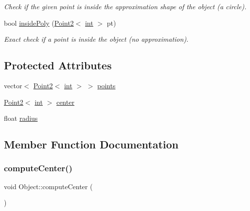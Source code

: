 \begin{DoxyCompactItemize}
\begin{DoxyCompactList}\small\item\em Check if the given point is inside the approximation shape of the object (a circle). \end{DoxyCompactList}\item 
bool \mbox{\hyperlink{class_object_a8f54d70eb539d4ea2d05993cfd51fcc9}{inside\+Poly}} (\mbox{\hyperlink{class_point2}{Point2}}$<$ \mbox{\hyperlink{draw_8hh_aa620a13339ac3a1177c86edc549fda9b}{int}} $>$ pt)
\begin{DoxyCompactList}\small\item\em Exact check if a point is inside the object (no approximation). \end{DoxyCompactList}\end{DoxyCompactItemize}
\subsection*{Protected Attributes}
\begin{DoxyCompactItemize}
\item 
vector$<$ \mbox{\hyperlink{class_point2}{Point2}}$<$ \mbox{\hyperlink{draw_8hh_aa620a13339ac3a1177c86edc549fda9b}{int}} $>$ $>$ \mbox{\hyperlink{class_object_aeb711bf0b9c9e157b436a177bd2a80e9}{points}}
\item 
\mbox{\hyperlink{class_point2}{Point2}}$<$ \mbox{\hyperlink{draw_8hh_aa620a13339ac3a1177c86edc549fda9b}{int}} $>$ \mbox{\hyperlink{class_object_a73b61b5048f06c8d79d1cbab64d953a0}{center}}
\item 
float \mbox{\hyperlink{class_object_ab2985661849d90b81488e4b5e779b798}{radius}}
\end{DoxyCompactItemize}


\subsection{Member Function Documentation}
\mbox{\label{class_object_afc241f20b0055c8840f849d40d108359}} 
\subsubsection{\texorpdfstring{computeCenter()}{computeCenter()}}
{\footnotesize\ttfamily void Object\+::compute\+Center (\begin{DoxyParamCaption}{ }\end{DoxyParamCaption})}



